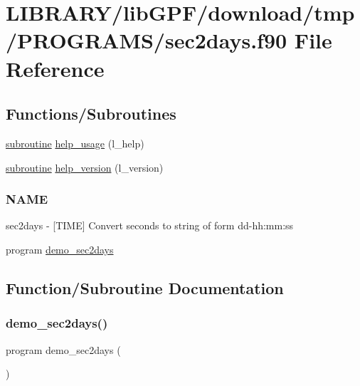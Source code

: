 \hypertarget{sec2days_8f90}{}\section{L\+I\+B\+R\+A\+R\+Y/lib\+G\+P\+F/download/tmp/\+P\+R\+O\+G\+R\+A\+M\+S/sec2days.f90 File Reference}
\label{sec2days_8f90}
\subsection*{Functions/\+Subroutines}
\begin{DoxyCompactItemize}
\item 
\hyperlink{M__stopwatch_83_8txt_acfbcff50169d691ff02d4a123ed70482}{subroutine} \hyperlink{sec2days_8f90_a3e09a3b52ee8fb04eeb93fe5761626a8}{help\+\_\+usage} (l\+\_\+help)
\item 
\hyperlink{M__stopwatch_83_8txt_acfbcff50169d691ff02d4a123ed70482}{subroutine} \hyperlink{sec2days_8f90_a39c21619b08a3c22f19e2306efd7f766}{help\+\_\+version} (l\+\_\+version)
\begin{DoxyCompactList}\small\item\em \subsubsection*{N\+A\+ME}

sec2days -\/ \mbox{[}T\+I\+ME\mbox{]} Convert seconds to string of form dd-\/hh\+:mm\+:ss \end{DoxyCompactList}\item 
program \hyperlink{sec2days_8f90_a85f052202d8a5417c74334a5fd499e2d}{demo\+\_\+sec2days}
\end{DoxyCompactItemize}


\subsection{Function/\+Subroutine Documentation}
\mbox{\label{sec2days_8f90_a85f052202d8a5417c74334a5fd499e2d}} 
\subsubsection{\texorpdfstring{demo\+\_\+sec2days()}{demo\_sec2days()}}
{\footnotesize\ttfamily program demo\+\_\+sec2days (\begin{DoxyParamCaption}{ }\end{DoxyParamCaption})}



